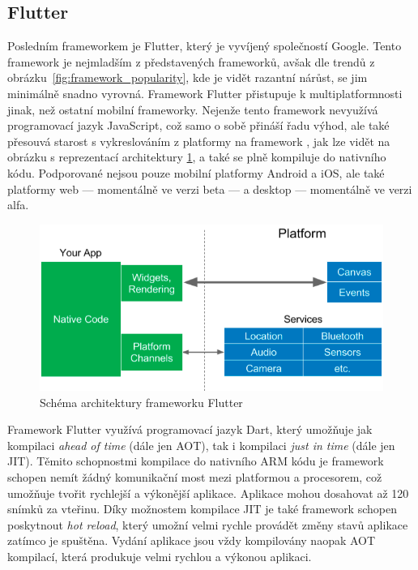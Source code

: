 \subsection{Flutter}

Posledním frameworkem je Flutter,
který je vyvíjený společností Google.
Tento framework je nejmladším z představených frameworků,
avšak dle trendů z obrázku~\ref{fig:framework_popularity},
kde je vidět razantní nárůst,
se jim minimálně snadno vyrovná.
Framework Flutter přistupuje k multiplatformnosti jinak,
než ostatní mobilní frameworky.
Nejenže tento framework nevyužívá programovací jazyk JavaScript,
což samo o sobě přináší řadu výhod,
ale také přesouvá starost s vykreslováním z platformy na framework
\cite{hackernoon_flutter},
jak lze vidět na obrázku s reprezentací architektury
\ref{fig:framework_flutter},
a také se plně kompiluje do nativního kódu.
\cite{dashmagazine_mobile_frameworks}
Podporované nejsou pouze mobilní platformy Android a iOS,
ale také platformy web
--- momentálně ve verzi beta ---
a desktop
--- momentálně ve verzi alfa.

\begin{figure}[ht!]
    \centering
    \includegraphics[width=\linewidth]{assets/technology-research/framework/flutter.png}
    \caption{Schéma architektury frameworku Flutter
    ~\cite{hackernoon_flutter}}
    \label{fig:framework_flutter}
\end{figure}

Framework Flutter využívá programovací jazyk Dart,
který umožňuje jak kompilaci \emph{ahead of time} (dále jen AOT),
tak i kompilaci \emph{just in time} (dále jen JIT).
\cite{hackernoon_flutter}
Těmito schopnostmi kompilace do nativního ARM kódu je framework schopen
nemít žádný komunikační most mezi platformou a procesorem,
což umožňuje tvořit rychlejší a výkonější aplikace.
Aplikace mohou dosahovat až 120 snímků za vteřinu.
\cite{dashmagazine_mobile_frameworks}
Díky možnostem kompilace JIT je také framework schopen poskytnout
\emph{hot reload},
který umožní velmi rychle provádět změny stavů aplikace zatímco je spuštěna.
Vydání aplikace jsou vždy kompilovány naopak AOT kompilací,
která produkuje velmi rychlou a výkonou aplikaci.
\cite{hackernoon_flutter}

